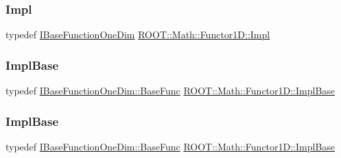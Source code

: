 \mbox{\label{classROOT_1_1Math_1_1Functor1D_ae7e0743edafd220a53b994cbbfbd7a9a}} 
\subsubsection{\texorpdfstring{Impl}{Impl}\hspace{0.1cm}{\footnotesize\ttfamily [3/3]}}
{\footnotesize\ttfamily typedef \mbox{\hyperlink{classROOT_1_1Math_1_1IBaseFunctionOneDim}{I\+Base\+Function\+One\+Dim}} \mbox{\hyperlink{classROOT_1_1Math_1_1Functor1D_ae7e0743edafd220a53b994cbbfbd7a9a}{R\+O\+O\+T\+::\+Math\+::\+Functor1\+D\+::\+Impl}}}

\mbox{\label{classROOT_1_1Math_1_1Functor1D_a1ade2017edb7db0cbaf9a27a864f4dd3}} 
\subsubsection{\texorpdfstring{ImplBase}{ImplBase}\hspace{0.1cm}{\footnotesize\ttfamily [1/3]}}
{\footnotesize\ttfamily typedef \mbox{\hyperlink{classROOT_1_1Math_1_1IBaseFunctionOneDim_a87fee465cea6b03c55aa6bc1cf641cc9}{I\+Base\+Function\+One\+Dim\+::\+Base\+Func}} \mbox{\hyperlink{classROOT_1_1Math_1_1Functor1D_a1ade2017edb7db0cbaf9a27a864f4dd3}{R\+O\+O\+T\+::\+Math\+::\+Functor1\+D\+::\+Impl\+Base}}}

\mbox{\label{classROOT_1_1Math_1_1Functor1D_a1ade2017edb7db0cbaf9a27a864f4dd3}} 
\subsubsection{\texorpdfstring{ImplBase}{ImplBase}\hspace{0.1cm}{\footnotesize\ttfamily [2/3]}}
{\footnotesize\ttfamily typedef \mbox{\hyperlink{classROOT_1_1Math_1_1IBaseFunctionOneDim_a87fee465cea6b03c55aa6bc1cf641cc9}{I\+Base\+Function\+One\+Dim\+::\+Base\+Func}} \mbox{\hyperlink{classROOT_1_1Math_1_1Functor1D_a1ade2017edb7db0cbaf9a27a864f4dd3}{R\+O\+O\+T\+::\+Math\+::\+Functor1\+D\+::\+Impl\+Base}}}

